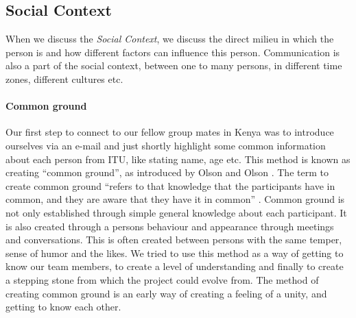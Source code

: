 %
%
%

\subsection{Social Context} \label{subsec:socialcontext}
When we discuss the \textit{Social Context}, we discuss the direct milieu in which the person is and how different factors can influence this person. Communication is also a part of the social context, 
between one to many persons, in different time zones, different cultures etc.\\

\paragraph{Common ground} \label{par:commonground}
Our first step to connect to our fellow group mates in Kenya was to introduce ourselves via an e-mail and just shortly highlight some common information about each person from ITU, like stating name, age etc. This method is known as creating ``common ground'', as introduced by Olson and Olson \cite{olson:2000:distance}. The term to create common ground ``refers to that knowledge that the participants have in common, and they are aware that they have it in common'' \cite{olson:2000:distance}. Common ground is not only established through simple general knowledge about each participant. It is also created through a persons behaviour and appearance through meetings and conversations. This is often created between persons with the same temper, sense of humor and the likes. We tried to use this method as a way of getting to know our team members, to create a level of understanding and finally to create a stepping stone from which the project could evolve from. The method of creating common ground is an early way of creating a feeling of a unity, and getting to know each other.

